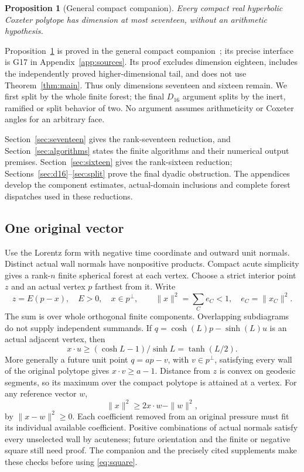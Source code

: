\documentclass[11pt]{article}
\newtheorem{proposition}[theorem]{Proposition}
\newcommand{\supp}[1]{\textsf{#1}}
\begin{document}
\begin{proposition}[General compact companion]\label{prop:general17}
Every compact real hyperbolic Coxeter polytope has dimension at most
seventeen, without an arithmetic hypothesis.
\end{proposition}

Proposition~\ref{prop:general17} is proved in the general compact
companion~\cite{ProjectGeneral}; its precise interface is \supp{G17}
in Appendix~\ref{app:sources}. Its proof excludes dimension eighteen,
includes the independently proved higher-dimensional tail, and does
not use Theorem~\ref{thm:main}. Thus only dimensions seventeen and
sixteen remain. We first split by the whole finite forest; the final
$D_{16}$ argument splits by the inert, ramified or split behavior of two.
No argument assumes arithmeticity or Coxeter angles for an arbitrary face.

Section~\ref{sec:seventeen} gives the rank-seventeen reduction, and
Section~\ref{sec:algorithms} states the finite algorithms and their
numerical output premises. Section~\ref{sec:sixteen} gives the
rank-sixteen reduction; Sections~\ref{sec:d16}--\ref{sec:split} prove
the final dyadic obstruction. The appendices develop the component
estimates, actual-domain inclusions and complete forest dispatches
used in these reductions.

\subsection{One original vector}
Use the Lorentz form with negative time coordinate and outward unit
normals. Distinct actual wall normals have nonpositive products.
Compact acute simplicity gives a rank-$n$ finite spherical forest at
each vertex. Choose a strict interior point $z$ and an actual vertex
$p$ farthest from it. Write
\[
 z=E(p-x),\quad E>0,\quad x\in p^\perp,\qquad
 \|x\|^2=\sum_C e_C<1,\quad e_C=\|x_C\|^2.
\]
The sum is over whole orthogonal finite components. Overlapping
subdiagrams do not supply independent summands.
If $q=\cosh(L)p-\sinh(L)u$ is an actual adjacent vertex, then
\begin{equation}\label{eq:edge}
 x\cdot u\ge(\cosh L-1)/\sinh L=\tanh(L/2).
\end{equation}
More generally a future unit point $q=ap-v$, with $v\in p^\perp$,
satisfying every wall of the original polytope gives $x\cdot v\ge a-1$.
Distance from $z$ is convex on geodesic segments, so its maximum over
the compact polytope is attained at a vertex.
For any reference vector $w$,
\begin{equation}\label{eq:square}
 \|x\|^2\ge2x\cdot w-\|w\|^2,
\end{equation}
by $\|x-w\|^2\ge0$.
Each coefficient removed from an original pressure must fit its
individual available coefficient. Positive combinations of actual
normals satisfy every unselected wall by acuteness; future orientation
and the finite or negative square still need proof. The companion
and the precisely cited supplements make these checks before using
\eqref{eq:square}.
\end{document}
